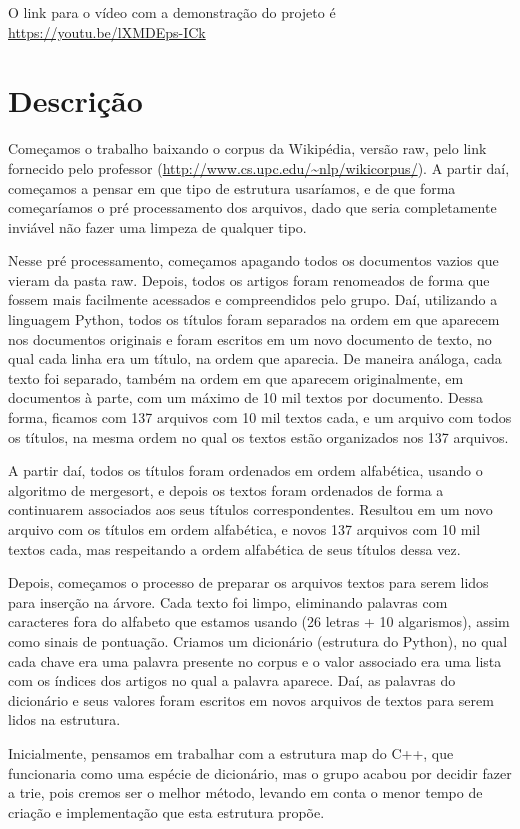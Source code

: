 \documentclass{article}
\begin{document}
O link para o vídeo com a demonstração do projeto é \url{https://youtu.be/lXMDEps-ICk}

\section{Descrição}

Começamos o trabalho baixando o corpus da Wikipédia, versão raw, pelo link fornecido pelo professor (\url{http://www.cs.upc.edu/~nlp/wikicorpus/}). A partir daí, começamos a pensar em que tipo de estrutura usaríamos, e de que forma começaríamos o pré processamento dos arquivos, dado que seria completamente inviável não fazer uma limpeza de qualquer tipo.

Nesse pré processamento, começamos apagando todos os documentos vazios que vieram da pasta raw. Depois, todos os artigos foram renomeados de forma que fossem mais facilmente acessados e compreendidos pelo grupo. Daí, utilizando a linguagem Python, todos os títulos foram separados na ordem em que aparecem nos documentos originais e foram escritos em um novo documento de texto, no qual cada linha era um título, na ordem que aparecia. De maneira análoga, cada texto foi separado, também na ordem em que aparecem originalmente, em documentos à parte, com um máximo de 10 mil textos por documento. Dessa forma, ficamos com 137 arquivos com 10 mil textos cada, e um arquivo com todos os títulos, na mesma ordem no qual os textos estão organizados nos 137 arquivos.

A partir daí, todos os títulos foram ordenados em ordem alfabética, usando o algoritmo de mergesort, e depois os textos foram ordenados de forma a continuarem associados aos seus títulos correspondentes. Resultou em um novo arquivo com os títulos em ordem alfabética, e novos 137 arquivos com 10 mil textos cada, mas respeitando a ordem alfabética de seus títulos dessa vez.

Depois, começamos o processo de preparar os arquivos textos para serem lidos para inserção na árvore. Cada texto foi limpo, eliminando palavras com caracteres fora do alfabeto que estamos usando (26 letras + 10 algarismos), assim como sinais de pontuação. Criamos um dicionário (estrutura do Python), no qual cada chave era uma palavra presente no corpus e o valor associado era uma lista com os índices dos artigos no qual a palavra aparece. Daí, as palavras do dicionário e seus valores foram escritos em novos arquivos de textos para serem lidos na estrutura.

Inicialmente, pensamos em trabalhar com a estrutura map do C++, que funcionaria como uma espécie de dicionário, mas o grupo acabou por decidir fazer a trie, pois cremos ser o melhor método, levando em conta o menor tempo de criação e implementação que esta estrutura propõe.
\end{document}
